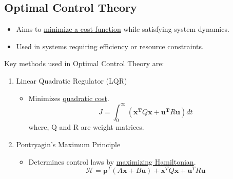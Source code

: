 \documentclass{article}
\begin{document}
\subsection{Optimal Control Theory}
\begin{itemize}
    \item Aims to \underline{minimize a cost function} while satisfying system dynamics.
    \item Used in systems requiring efficiency or resource constraints.
\end{itemize}
Key methods used in Optimal Control Theory are:
\begin{enumerate}
    \item Linear Quadratic Regulator (LQR)
        \begin{itemize}
            \item Minimizes \underline{quadratic cost}.
                \[ J = \int_{0}^{\infty} (\mathbf{x^{T}}Q\mathbf{x} + \mathbf{u^{T}}R\mathbf{u}) dt \]
                where, Q and R are weight matrices.
        \end{itemize}
    \item Pontryagin's Maximum Principle
        \begin{itemize}
            \item Determines control laws by \underline{maximizing Hamiltonian}.
                \[ \mathcal{H} = \mathbf{p}^{T}(A\mathbf{x} + B\mathbf{u}) + \mathbf{x}^{T}Q\mathbf{x} + \mathbf{u}^{T}R\mathbf{u} \]
        \end{itemize}
\end{enumerate}
\end{document}
